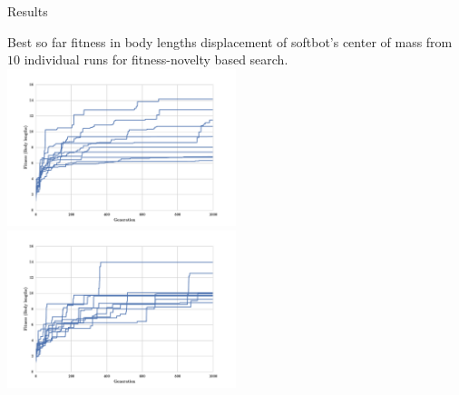 \documentclass{beamer}
\begin{document}
\begin{frame}[allowframebreaks]{Results}
\begin{minipage}{\textwidth}
\begin{block}{Best so far fitness in body lengths displacement of softbot's center of mass from $10$ individual runs for fitness-novelty based search.}
\includegraphics[width=0.5\textwidth]{figures/results/indRunsSize10Fitness.pdf}	
\includegraphics[width=0.5\textwidth]{figures/results/indRunsSize10Novelty.pdf}
\end{block}
\end{minipage}


\end{frame}
\end{document}
